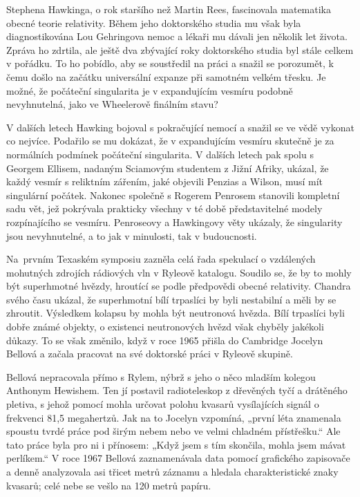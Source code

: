   Stephena Hawkinga, o rok staršího než Martin Rees, fascinovala matematika obecné teorie
  relativity. Během jeho doktorského studia mu však byla diagnostikována Lou Gehringova nemoc a
  lékaři mu dávali jen několik let života. Zpráva ho zdrtila, ale ještě dva zbývající roky
  doktorského studia byl stále celkem v pořádku. To ho pobídlo, aby se soustředil na práci a snažil
  se porozumět, k čemu došlo na začátku universální expanze při samotném velkém třesku. Je možné, že
  počáteční singularita je v expandujícím vesmíru podobně nevyhnutelná, jako ve Wheelerově finálním
  stavu? 

  V dalších letech Hawking bojoval s pokračující nemocí a snažil se ve vědě vykonat co nejvíce.
  Podařilo se mu dokázat, že v expandujícím vesmíru skutečně je za normálních podmínek počáteční
  singularita. V dalších letech pak spolu s Georgem Ellisem, nadaným Sciamovým studentem z Jižní
  Afriky, ukázal, že každý vesmír s reliktním zářením, jaké objevili Penzias a Wilson, musí mít
  singulární počátek. Nakonec společně s Rogerem Penrosem stanovili kompletní sadu vět, jež
  pokrývala prakticky všechny v té době představitelné modely rozpínajícího se vesmíru. Penroseovy a
  Hawkingovy věty ukázaly, že singularity jsou nevyhnutelné, a to jak v minulosti, tak v
  budoucnosti. 

  Na prvním Texaském symposiu zazněla celá řada spekulací o vzdálených mohutných zdrojích rádiových
  vln v Ryleově katalogu. Soudilo se, že by to mohly být superhmotné hvězdy, hroutící se podle
  předpovědi obecné relativity. Chandra svého času ukázal, že superhmotní bílí trpaslíci by byli
  nestabilní a měli by se zhroutit. Výsledkem kolapsu by mohla být neutronová hvězda. Bílí trpaslíci
  byli dobře známé objekty, o existenci neutronových hvězd však chyběly jakékoli důkazy. To se však
  změnilo, když v roce 1965 přišla do Cambridge Jocelyn Bellová a začala pracovat na své doktorské
  práci v Ryleově skupině. 

  Bellová nepracovala přímo s Rylem, nýbrž s jeho o něco mladším kolegou Anthonym Hewishem. Ten jí
  postavil radioteleskop z dřevěných tyčí a drátěného pletiva, s jehož pomocí mohla určovat polohu
  kvasarů vysílajících signál o frekvenci 81,5 megahertzů. Jak na to Jocelyn vzpomíná, „první léta
  znamenala spoustu tvrdé práce pod širým nebem nebo ve velmi chladném přístřešku.“ Ale tato práce
  byla pro ni i přínosem: „Když jsem s tím skončila, mohla jsem mávat perlíkem.“ V roce 1967 Bellová
  zaznamenávala data pomocí grafického zapisovače a denně analyzovala asi třicet metrů záznamu a
  hledala charakteristické znaky kvasarů; celé nebe se vešlo na 120 metrů papíru. 

